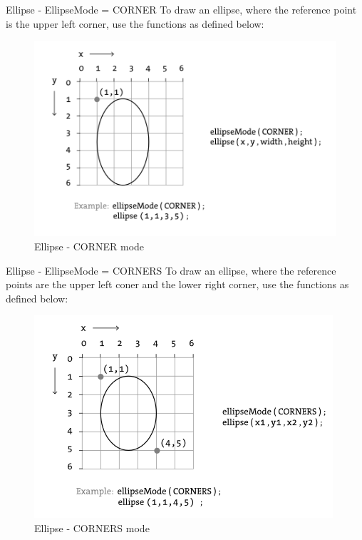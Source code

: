 \documentclass{beamer}
\begin{document}
\begin{frame}{Ellipse - EllipseMode = CORNER}
To draw an ellipse, where the reference point is the upper left corner, use
the functions as defined below:\\

\begin{figure}[H]
\centerline{\includegraphics[scale=0.5]{ellipse_corner_mode.png}}
\caption{Ellipse - CORNER mode}
\end{figure}
\end{frame}

\begin{frame}{Ellipse - EllipseMode = CORNERS}
To draw an ellipse, where the reference points are the upper left coner and 
the lower right corner, use the functions as defined below:\\

\begin{figure}[H]
\centerline{\includegraphics[scale=0.5]{ellipse_corners_mode.png}}
\caption{Ellipse - CORNERS mode}
\end{figure}
\end{frame}
\end{document}
